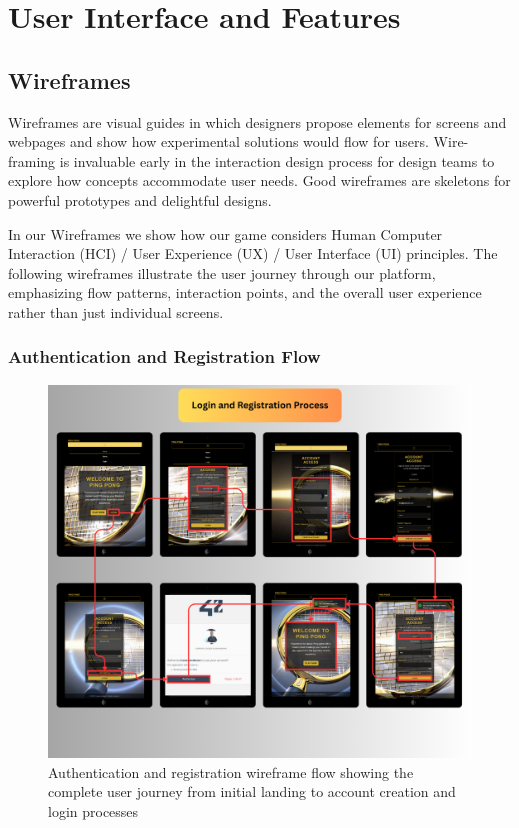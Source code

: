 \chapter{User Interface and Features}

\section{Wireframes}

Wireframes are visual guides in which designers propose elements for screens and webpages and show how experimental solutions would flow for users. Wire-framing is invaluable early in the interaction design process for design teams to explore how concepts accommodate user needs. Good wireframes are skeletons for powerful prototypes and delightful designs.

In our Wireframes we show how our game considers Human Computer Interaction (HCI) / User Experience (UX) / User Interface (UI) principles. The following wireframes illustrate the user journey through our platform, emphasizing flow patterns, interaction points, and the overall user experience rather than just individual screens.

\subsection{Authentication and Registration Flow}

\begin{figure}[H]
    \centering
    \includegraphics[width=0.9\linewidth]{Figures/images/wireframes/1.png}
    \caption{Authentication and registration wireframe flow showing the complete user journey from initial landing to account creation and login processes}
    \label{fig:wireframe-auth-flow}
\end{figure}

